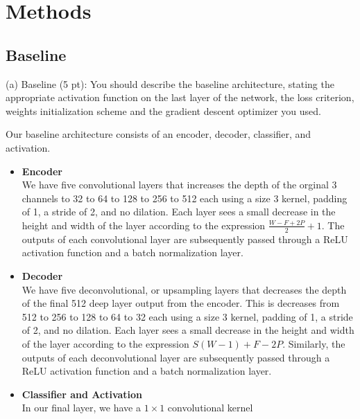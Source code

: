 \section*{Methods}

\subsection*{Baseline}
(a) Baseline (5 pt): You should describe the baseline architecture, stating the appropriate activation function on the last layer of the network, the loss criterion, weights initialization scheme and the gradient descent optimizer you used.

Our baseline architecture consists of an encoder, decoder, classifier, and activation.
\begin{itemize}
	\item[] \textbf{Encoder} \\
		We have five convolutional layers that increases the depth of the orginal 3 channels to 32 to 64 to 128 to 256 to 512 each using a size 3 kernel, padding of 1, a stride of 2, and no dilation. Each layer sees a small decrease in the height and width of the layer according to the expression $\frac{W - F + 2P}{2} + 1$. The outputs of each convolutional layer are subsequently passed through a ReLU activation function and a batch normalization layer.
	\item[] \textbf{Decoder} \\
		We have five deconvolutional, or upsampling layers that decreases the depth of the final 512 deep layer output from the encoder. This is decreases from 512 to 256 to 128 to 64 to 32 each using a size 3 kernel, padding of 1, a stride of 2, and no dilation. Each layer sees a small decrease in the height and width of the layer according to the expression $S(W - 1) + F - 2P$. Similarly, the outputs of each deconvolutional layer are subsequently passed through a ReLU activation function and a batch normalization layer.
	\item[] \textbf{Classifier and Activation} \\
		In our final layer, we have a $1 \times 1$ convolutional kernel
\end{itemize}

